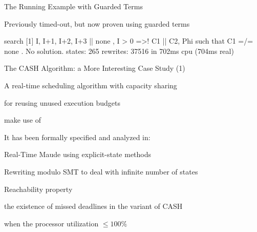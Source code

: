 \documentclass[11pt]{beamer}
\begin{document}
\begin{frame}[fragile]{The Running Example with Guarded Terms}
\begin{outeritemize}
    \item \alert{Previously timed-out}, but now proven using guarded terms
    
\begin{maude}
search [1] { I, I+1, I+2, I+3 || none , I > 0 }
       =>! { C1 || C2, Phi } such that C1 =/= none .
No solution.
states: 265  rewrites: 37516 in 702ms cpu (704ms real) 
\end{maude}
\end{outeritemize}
\end{frame}



\begin{frame}{The CASH Algorithm: a More Interesting Case Study (1)}
\begin{outeritemize}
    \item A real-time scheduling algorithm with capacity sharing
    
    \begin{inneritemize}
        \item for reusing unused execution budgets
        \item make use of 
    \end{inneritemize}

    \item It has been formally specified and analyzed in:
    
    \begin{inneritemize}
        \item Real-Time Maude using explicit-state methods %
        \item Rewriting modulo SMT to deal with infinite number of states
    \end{inneritemize}
    
    \pause
    \item Reachability property 
    
    \begin{inneritemize}
        \item the existence of missed deadlines in the variant of CASH
        \item when the processor utilization $\leq 100 \%$
    \end{inneritemize}
    
\end{outeritemize}
\end{frame}
\end{document}
